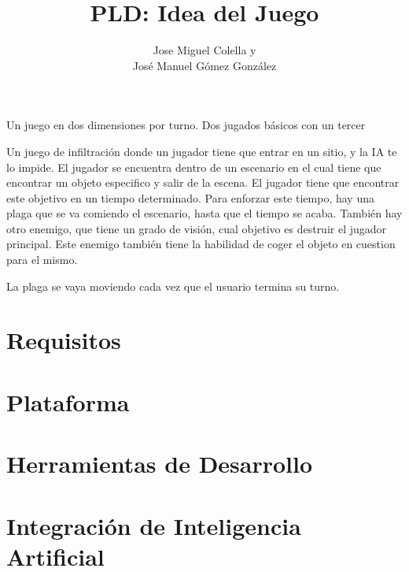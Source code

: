 \documentclass[a4paper]{article}
\title{PLD: Idea del Juego}
\author{Jose Miguel Colella y\\José Manuel Gómez González}
\begin{document}
\maketitle

Un juego en dos dimensiones por turno. Dos jugados básicos con un tercer 

Un juego de infiltración donde un jugador tiene que entrar en un sitio, y la IA te lo impide.
El jugador se encuentra dentro de un escenario en el cual tiene que encontrar un objeto especifico y salir de la escena. El jugador tiene que encontrar este objetivo en un tiempo determinado. Para enforzar este tiempo, hay una plaga que se va comiendo el escenario, hasta que el tiempo se acaba.
También hay otro enemigo, que tiene un grado de visión, cual objetivo es destruir el jugador principal. Este enemigo también tiene la habilidad de coger el objeto en cuestion para el mismo.

La plaga se vaya moviendo cada vez que el usuario termina su turno. 

\section{Requisitos}


\section{Plataforma}


\section{Herramientas de Desarrollo}



\section{Integración de Inteligencia Artificial}
\end{document}
